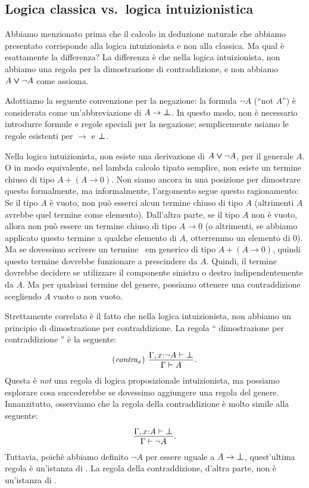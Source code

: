 \documentclass{article}
\begin{document}
\subsection{Logica classica vs.\ logica intuizionistica}

Abbiamo menzionato prima che il calcolo in deduzione naturale che abbiamo
presentato corrisponde alla logica intuizionista e non alla classica. 
Ma qual \`e esattamente la differenza? La differenza \`e
che nella logica intuizionista, non abbiamo una regola per la dimostrazione di
contraddizione, e non abbiamo $A\mathbin{\textrm{\rm\boldmath $\vee$}}\neg A$ come assioma. 

Adottiamo la seguente convenzione per la negazione: la formula $\neg
A$ (``not $A$'') \`e considerata come un'abbreviazione di $A\to\textrm{\rm\boldmath $\bot$}$.
In questo modo, non \`e necessario introdurre formule e regole speciali per la
negazione; semplicemente usiamo le regole esistenti per $\to$ e $\textrm{\rm\boldmath $\bot$}$.

Nella logica intuizionista, non esiste una derivazione di $A\mathbin{\textrm{\rm\boldmath $\vee$}}\neg A$, per il 
generale $A$. O in modo equivalente, nel lambda calcolo tipato semplice, 
non esiste un termine chiuso di tipo $A+(A\to 0)$. Non siamo ancora
in una posizione per dimostrare questo formalmente, ma informalmente, 
l'argomento segue questo ragionamento: Se il tipo $A$ \`e vuoto, non pu\`o esserci
alcun termine chiuso di tipo $A$ (altrimenti $A$ avrebbe quel termine come 
elemento). Dall'altra parte, se il tipo $A$ non \`e vuoto, allora non pu\`o essere 
un termine chiuso di tipo $A\to 0$ (o altrimenti, se abbiamo applicato questo 
termine a qualche elemento di $A$, otterremmo un elemento di $0$). Ma se
dovessimo scrivere un termine {\ em generico} di tipo $A+(A\to 0)$, quindi 
questo termine dovrebbe funzionare a prescindere da $A$. Quindi, il termine 
dovrebbe decidere se utilizzare il componente sinistro o destro indipendentemente 
da $A$. Ma per qualsiasi termine del genere, possiamo ottenere una contraddizione
scegliendo $A$ vuoto o non vuoto.

Strettamente correlato \`e il fatto che nella logica intuizionista, non abbiamo
un principio di dimostrazione per contraddizione. La regola `` dimostrazione per contraddizione '' \`e la seguente:
\[ \trule{contra$_x$}\ \deriv{\Gamma,\typ{x}{\neg A}\tj\cfalse}{\Gamma\tj A}.
\]
Questa \`e {\em not} una regola di logica proposizionale intuizionista, ma possiamo 
esplorare cosa succederebbe se dovessimo aggiungere una regola del genere. Innanzitutto, 
osserviamo che la regola della contraddizione \`e molto simile alla seguente:
\[ \deriv{\Gamma,\typ{x}{A}\tj\cfalse}{\Gamma\tj\neg A}.
\]
Tuttavia, poich\`e abbiamo definito  $\neg A$ per essere uguale a $A\to\textrm{\rm\boldmath $\bot$}$,
quest'ultima regola \`e un'istanza di . La regola della contraddizione, 
d'altra parte, non \`e un'istanza di .
\end{document}
